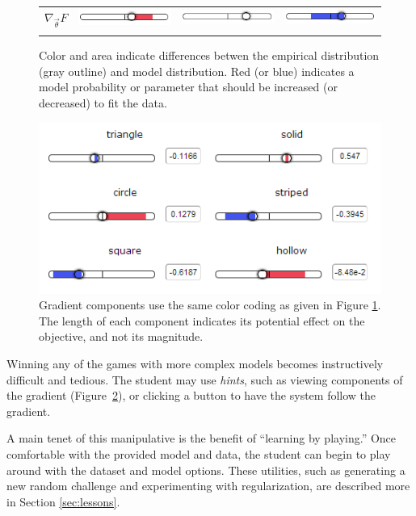 \documentclass[11pt,letterpaper]{article}
\begin{document}
\begin{figure}[t]
\begin{tabular}{
>{\centering\arraybackslash}m{} 
>{\centering\arraybackslash}m{}
>{\centering\arraybackslash}m{}
>{\centering\arraybackslash}m{}}
$\nabla_{\vec{\theta}} F$ 
& \includegraphics[scale=.25]{images/goldilocks-gradient-small.PNG}
& \includegraphics[scale=.25]{images/goldilocks-gradient-justright.PNG}
& \includegraphics[scale=.25]{images/goldilocks-gradient-large.PNG}\\ \\ 

\end{tabular}
\caption{Color and area indicate differences betwen the empirical
  distribution (gray outline) and model distribution. Red (or blue)
  indicates a model probability or parameter that should be
  increased (or decreased) to fit the data.}
\label{fig:colorsize_inventory}
\end{figure}

\begin{figure}[t]
\centering
\small
\includegraphics[scale=.65]{images/gradient-lesson7.PNG}
\caption{Gradient components use the same color coding as given in Figure \ref{fig:colorsize_inventory}. The length of each component indicates its potential effect on the objective, and not its magnitude.}
\label{fig:gradients}
\end{figure}

Winning any of the games with more complex models becomes instructively
difficult and tedious. 
The student may use \textit{hints}, such as
viewing components of the gradient (Figure~\ref{fig:gradients}), or 
clicking a button to have the system follow the gradient.  

A main tenet of this manipulative is the benefit of ``learning by playing.'' 
Once comfortable with the provided model and data, the student can begin to play 
around with the dataset and model options. These utilities, such as
generating a new random challenge and experimenting with regularization, 
are described more in Section \ref{sec:lessons}.
\end{document}
